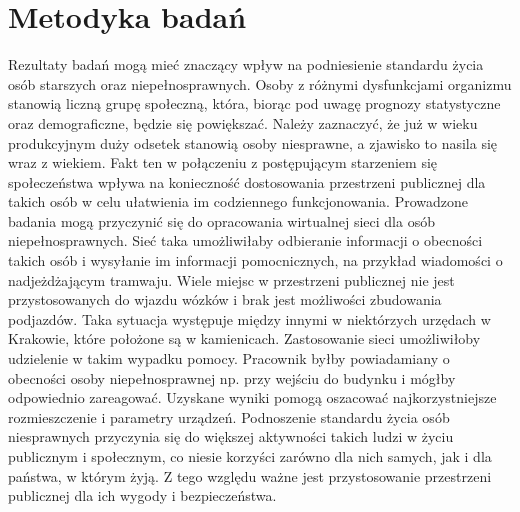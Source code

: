 \documentclass[a4paper]{article}
\begin{document}
\section{Metodyka badań}
Rezultaty badań mogą mieć znaczący wpływ na podniesienie standardu życia osób starszych oraz niepełnosprawnych. Osoby z różnymi dysfunkcjami organizmu stanowią liczną grupę społeczną, która, biorąc pod uwagę prognozy statystyczne oraz demograficzne, będzie się powiększać. Należy zaznaczyć, że już w wieku produkcyjnym duży odsetek stanowią osoby niesprawne, a zjawisko to nasila się wraz z wiekiem. Fakt ten w połączeniu z postępującym starzeniem się społeczeństwa wpływa na konieczność dostosowania przestrzeni publicznej dla takich osób w celu ułatwienia im codziennego funkcjonowania. Prowadzone badania mogą przyczynić się do opracowania wirtualnej sieci dla osób niepełnosprawnych. Sieć taka umożliwiłaby odbieranie informacji o obecności takich osób i wysyłanie im informacji pomocnicznych, na przykład wiadomości o nadjeżdżającym tramwaju. Wiele miejsc w przestrzeni publicznej nie jest przystosowanych do wjazdu wózków i brak jest możliwości zbudowania podjazdów. Taka sytuacja występuje między innymi w niektórzych urzędach w Krakowie, które położone są w kamienicach. Zastosowanie sieci umożliwiłoby udzielenie w takim wypadku pomocy. Pracownik byłby powiadamiany o obecności osoby niepełnosprawnej np. przy wejściu do budynku i mógłby odpowiednio zareagować. Uzyskane wyniki pomogą oszacować najkorzystniejsze rozmieszczenie i parametry urządzeń. Podnoszenie standardu życia osób niesprawnych przyczynia się do większej aktywności takich ludzi w życiu publicznym i społecznym, co niesie korzyści zarówno dla nich samych, jak i dla państwa, w którym żyją. Z tego względu ważne jest przystosowanie przestrzeni publicznej dla ich wygody i bezpieczeństwa.
\end{document}
